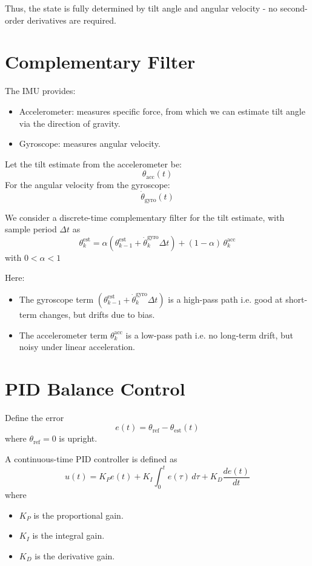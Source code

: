 \documentclass[11pt,a4paper]{article}
\begin{document}
Thus, the state is fully determined by tilt angle and angular velocity - no second-order derivatives are required. 

\section{Complementary Filter}

The IMU provides:
\begin{itemize}
  \item Accelerometer: measures specific force, from which we can estimate tilt angle via the direction of gravity.
  \item Gyroscope: measures angular velocity. 
\end{itemize}

Let the tilt estimate from the accelerometer be: 
\[
\theta_{\text{acc}}(t)
\]
For the angular velocity from the gyroscope: 
\[
\dot{\theta}_{\text{gyro}}(t)
\]

We consider a discrete-time complementary filter for the tilt estimate, with sample period \( \Delta t \) as
\[
\theta_{k}^{\text{est}} = \alpha \left( \theta_{k-1}^{\text{est}} + \dot{\theta}_{k}^{\text{gyro}} \Delta t \right)
+ (1-\alpha)\,\theta_{k}^{\text{acc}}
\]
with \(0 < \alpha < 1\)

Here:
\begin{itemize}
  \item The gyroscope term \( ( \theta_{k-1}^{\text{est}} + \dot{\theta}_{k}^{\text{gyro}} \Delta t ) \) is a high-pass path i.e. good at short-term changes, but drifts due to bias.
  \item The accelerometer term \(\theta_{k}^{\text{acc}}\) is a low-pass path i.e. no long-term drift, but noisy under linear acceleration.
\end{itemize}

\section{PID Balance Control}

Define the error
\[
e(t) = \theta_{\text{ref}} - \theta_{\text{est}}(t)
\]
where \(\theta_{\text{ref}} = 0\) is upright.


A continuous-time PID controller is defined as
\[
u(t) = K_P e(t) + K_I \int_0^t e(\tau)\,d\tau + K_D \frac{d e(t)}{dt}
\]
where
\begin{itemize}
  \item \(K_P\) is the proportional gain.
  \item \(K_I\) is the integral gain.
  \item \(K_D\) is the derivative gain.
\end{itemize}
\end{document}
